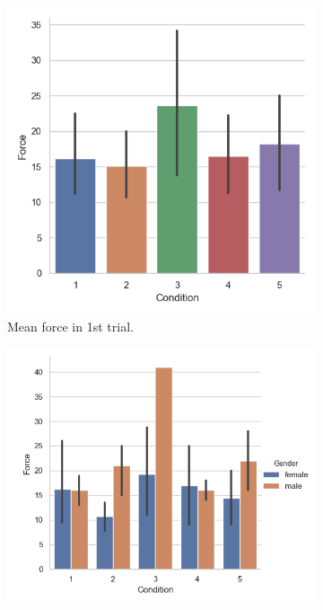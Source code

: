 \begin{figure}[H]
 \begin{subfigure}[b]{0.5\textwidth}
     \centering
     \includegraphics[scale=0.5]{Files/Plots/force_in_first_trial.png}
     \caption{Mean force in 1st trial.}
     \label{fig:meanF1st}
 \end{subfigure}
  \begin{subfigure}[b]{0.5\textwidth}
     \centering
     \includegraphics[scale=0.5]{Files/Plots/force_first_gen.png}

\end{subfigure}
\end{figure}
